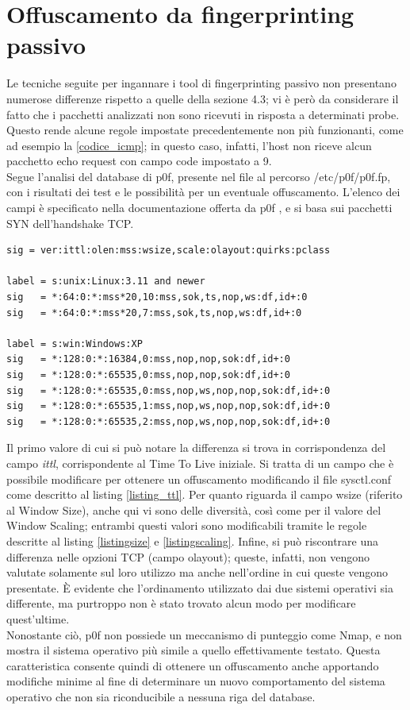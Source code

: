 \section{Offuscamento da fingerprinting passivo}
Le tecniche seguite per ingannare i tool di fingerprinting passivo non presentano numerose differenze rispetto a quelle della sezione 4.3; vi è però da considerare il fatto che i pacchetti analizzati non sono ricevuti in risposta a determinati probe.
Questo rende alcune regole impostate precedentemente non più funzionanti, come ad esempio la \ref{codice_icmp}; in questo caso, infatti, l'host non riceve alcun pacchetto echo request con campo code impostato a 9.
\\
Segue l'analisi del database di p0f, presente nel file al percorso /etc/p0f/p0f.fp, con i risultati dei test e le possibilità per un eventuale offuscamento. L'elenco dei campi è specificato nella documentazione offerta da p0f \cite{database_p0f}, e si basa sui pacchetti SYN dell'handshake TCP. 
\begin{lstlisting}[caption={Fingerptinting TCP con p0f}]
sig = ver:ittl:olen:mss:wsize,scale:olayout:quirks:pclass

label = s:unix:Linux:3.11 and newer
sig   = *:64:0:*:mss*20,10:mss,sok,ts,nop,ws:df,id+:0
sig   = *:64:0:*:mss*20,7:mss,sok,ts,nop,ws:df,id+:0

label = s:win:Windows:XP
sig   = *:128:0:*:16384,0:mss,nop,nop,sok:df,id+:0
sig   = *:128:0:*:65535,0:mss,nop,nop,sok:df,id+:0
sig   = *:128:0:*:65535,0:mss,nop,ws,nop,nop,sok:df,id+:0
sig   = *:128:0:*:65535,1:mss,nop,ws,nop,nop,sok:df,id+:0
sig   = *:128:0:*:65535,2:mss,nop,ws,nop,nop,sok:df,id+:0
\end{lstlisting}

Il primo valore di cui si può notare la differenza si trova in corrispondenza del campo \textit{ittl}, corrispondente al Time To Live iniziale.
Si tratta di un campo che è possibile modificare per ottenere un offuscamento modificando il file sysctl.conf come descritto al listing \ref{listing_ttl}.
Per quanto riguarda il campo wsize (riferito al Window Size), anche qui vi sono delle diversità, così come per il valore del Window Scaling; entrambi questi valori sono modificabili tramite le regole descritte al listing \ref{listingsize} e \ref{listingscaling}.
Infine, si può riscontrare una differenza nelle opzioni TCP (campo olayout); queste, infatti, non vengono valutate solamente sul loro utilizzo ma anche nell'ordine in cui queste vengono presentate. È evidente che l'ordinamento utilizzato dai due sistemi operativi sia differente, ma purtroppo non è stato trovato alcun modo per modificare quest'ultime.\\
Nonostante ciò, p0f non possiede un meccanismo di punteggio come Nmap, e non mostra il sistema operativo più simile a quello effettivamente testato. Questa caratteristica consente quindi di ottenere un offuscamento anche apportando modifiche minime al fine di determinare un nuovo comportamento del sistema operativo che non sia riconducibile a nessuna riga del database.

